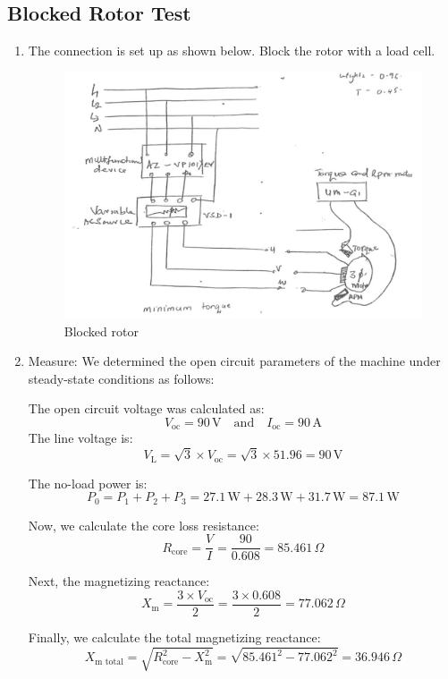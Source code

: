 \documentclass[12pt,a4paper]{report}
\begin{document}
\subsection{Blocked Rotor Test}
\begin{enumerate}
    \item The connection is set up as shown below. Block the rotor with a load cell.
    \begin{figure}[H]
        \centering
        \includegraphics[width=\linewidth]{figure_6_6.jpeg}
        \caption{Blocked rotor}
        \label{fig_6}
    \end{figure}
    \item Measure:
    We determined the open circuit parameters of the machine under steady-state conditions as follows:

The open circuit voltage was calculated as:
\[
V_{\text{oc}} = 90 \, \text{V} \quad \text{and} \quad I_{\text{oc}} = 90 \, \text{A}
\]
The line voltage is:
\[
V_{\text{L}} = \sqrt{3} \times V_{\text{oc}} = \sqrt{3} \times 51.96 = 90 \, \text{V}
\]

The no-load power is:
\[
P_0 = P_1 + P_2 + P_3 = 27.1 \, \text{W} + 28.3 \, \text{W} + 31.7 \, \text{W} = 87.1 \, \text{W}
\]

Now, we calculate the core loss resistance:
\[
R_{\text{core}} = \frac{V}{I} = \frac{90}{0.608} = 85.461 \, \Omega
\]

Next, the magnetizing reactance:
\[
X_{\text{m}} = \frac{3 \times V_{\text{oc}}}{2} = \frac{3 \times 0.608}{2} = 77.062 \, \Omega
\]

Finally, we calculate the total magnetizing reactance:
\[
X_{\text{m total}} = \sqrt{R_{\text{core}}^2 - X_{\text{m}}^2} = \sqrt{85.461^2 - 77.062^2} = 36.946 \, \Omega
\]
\end{enumerate}
\end{document}
